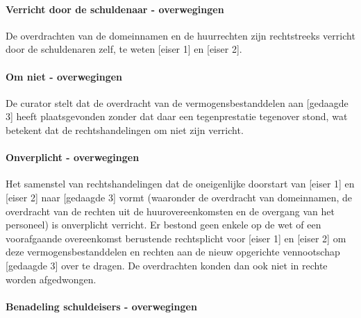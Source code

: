 \documentclass[
  dutch,
  a4paper,
]{article}
\begin{document}
\paragraph{Verricht door de schuldenaar - overwegingen}\label{verricht-door-de-schuldenaar---overwegingen-23}

De overdrachten van de domeinnamen en de huurrechten zijn rechtstreeks verricht door de schuldenaren zelf, te weten {[}eiser 1{]} en {[}eiser 2{]}.

\paragraph{Om niet - overwegingen}\label{om-niet---overwegingen-23}

De curator stelt dat de overdracht van de vermogensbestanddelen aan {[}gedaagde 3{]} heeft plaatsgevonden zonder dat daar een tegenprestatie tegenover stond, wat betekent dat de rechtshandelingen om niet zijn verricht.

\paragraph{Onverplicht - overwegingen}\label{onverplicht---overwegingen-23}

Het samenstel van rechtshandelingen dat de oneigenlijke doorstart van {[}eiser 1{]} en {[}eiser 2{]} naar {[}gedaagde 3{]} vormt (waaronder de overdracht van domeinnamen, de overdracht van de rechten uit de huurovereenkomsten en de overgang van het personeel) is onverplicht verricht. Er bestond geen enkele op de wet of een voorafgaande overeenkomst berustende rechtsplicht voor {[}eiser 1{]} en {[}eiser 2{]} om deze vermogensbestanddelen en rechten aan de nieuw opgerichte vennootschap {[}gedaagde 3{]} over te dragen. De overdrachten konden dan ook niet in rechte worden afgedwongen.

\paragraph{Benadeling schuldeisers - overwegingen}\label{benadeling-schuldeisers---overwegingen-23}
\end{document}
